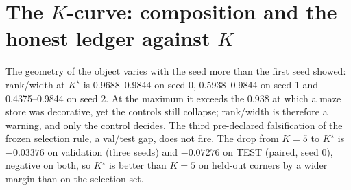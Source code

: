 \documentclass{article} %
\newcommand{\Kstar}{\ensuremath{K^{\star}}}
\begin{document}
\section{The $K$-curve: composition and the honest ledger against $K$}
\label{app:kcurve}

The geometry of the object varies with the seed more than the first seed showed:
rank/width at $\Kstar$ is 0.9688--0.9844 on seed 0, 0.5938--0.9844 on seed 1 and
0.4375--0.9844 on seed 2. At the maximum it exceeds the 0.938 at which a maze store was
decorative, yet the controls still collapse; rank/width is therefore a warning, and only the
control decides. %
The third pre-declared falsification of the frozen selection rule, a val/test gap, does not fire.
The drop from $K=5$ to $\Kstar$ is $-0.03376$ on validation (three seeds) and $-0.07276$ on
TEST (paired, seed 0), negative on both, so $\Kstar$ is better than $K=5$ on held-out corners
by a wider margin than on the selection set. %
\end{document}
